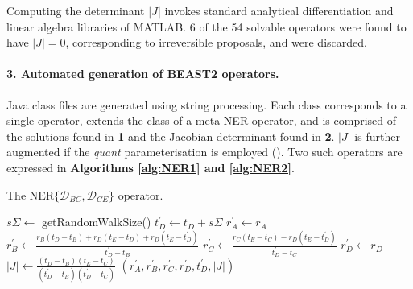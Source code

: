 \documentclass[10pt,letterpaper]{article}
\begin{document}
Computing the determinant $|J|$ invokes standard analytical differentiation and linear algebra libraries of MATLAB. 
6 of the 54 solvable operators were found to have $|J|=0$, corresponding to irreversible proposals, and were discarded. 


\paragraph{3. Automated generation of BEAST2 operators.} Java class files are generated using string processing. Each class corresponds to a single operator, extends the class of a meta-NER-operator, and is comprised of the solutions found in \textbf{1} and the Jacobian determinant found in \textbf{2}. $|J|$ is further augmented if the \textit{quant} parameterisation is employed (\textbf{}).
Two such operators are expressed in \textbf{Algorithms \ref{alg:NER1} and \ref{alg:NER2}}.



\begin{algorithm}
\caption{The NER$\{ \mathcal{D}_{BC}, \mathcal{D}_{CE} \}$ operator.}
\begin{algorithmic}[1]


	\State
    \State $s\Sigma \leftarrow $ getRandomWalkSize() 
    \State $t_D^\prime \leftarrow t_D + s\Sigma$ 
    \State
    \State $r_A^\prime \leftarrow r_A$ 
    \State $r_B^\prime \leftarrow \frac{r_B(t_D - t_B) + r_D(t_E - t_D) + r_D(t_E - t_D^\prime)}{t_D^\prime - t_B}$
    \State $r_C^\prime \leftarrow \frac{r_C(t_E - t_C) - r_D(t_E - t_D^\prime)}{t_D^\prime - t_C}$
    \State $r_D^\prime \leftarrow r_D$
    \State
    \State $|J| \leftarrow \frac{(t_D - t_B)(t_E - t_C)}{(t_D^\prime - t_B)(t_D^\prime - t_C)}$ 
    \State \Return $(r_A^\prime, r_B^\prime, r_C^\prime, r_D^\prime, t_D^\prime, |J|)$
    
\EndProcedure

\end{algorithmic}
\label{alg:NER1}
\end{algorithm}
\end{document}
